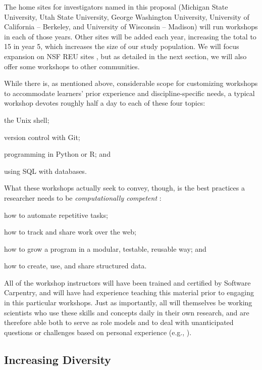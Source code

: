 \documentclass{proposalnsf}
\begin{document}
The home sites for investigators named in this proposal (Michigan
State University, Utah State University, George Washington University,
University of California -- Berkeley, and University of Wisconsin --
Madison) will run workshops in each of those years.  Other sites will
be added each year, increasing the total to 15 in year 5, which
increases the size of our study population.  We will focus expansion
on NSF REU sites \cite{nsfreu}, but as detailed in the next section,
we will also offer some workshops to other communities.

While there is, as mentioned above, considerable scope for customizing
workshops to accommodate learners' prior experience and
discipline-specific needs, a typical workshop devotes roughly half a
day to each of these four topics:

\begin{compactitem}
\item
  the Unix shell;
\item
  version control with Git;
\item
  programming in Python or R; and
\item
  using SQL with databases.
\end{compactitem}

What these workshops actually seek to convey, though, is the best
practices a researcher needs to be \emph{computationally competent}
\cite{wilson2013}:

\begin{compactitem}
\item
  how to automate repetitive tasks;
\item
  how to track and share work over the web;
\item
  how to grow a program in a modular, testable, reusable way; and
\item
  how to create, use, and share structured data.
\end{compactitem}

All of the workshop instructors will have been trained and certified
by Software Carpentry, and will have had experience teaching this
material prior to engaging in this particular workshops.  Just as
importantly, all will themselves be working scientists who use these
skills and concepts daily in their own research, and are therefore
able both to serve as role models and to deal with unanticipated
questions or challenges based on personal experience (e.g.,
\cite{ram2013}).

\subsection{Increasing Diversity}
\end{document}
